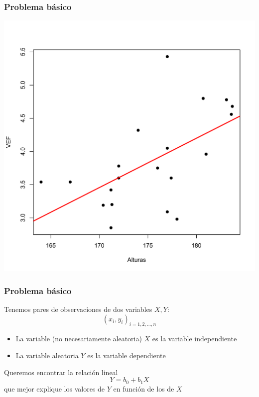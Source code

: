 \documentclass[12pt,t]{beamer}
\renewcommand{\emph}[1]{{\color{red}#1}}
\theoremstyle{plain}
\theoremstyle{definition}
\begin{document}
\begin{frame}
\frametitle{Problema básico}
\vspace*{-1cm}

\begin{center}
\includegraphics[width=0.8\linewidth]{plotVEF2.pdf}
\end{center}
\end{frame}




\begin{frame}
\frametitle{Problema básico}

Tenemos pares de observaciones de dos variables $X,Y$:
$$
(x_i,y_i)_{i=1,2,\ldots,n}
$$

\begin{itemize}
\item La variable (no necesariamente aleatoria) $X$ es la variable  \emph{independiente}

\item La variable aleatoria $Y$ es la variable \emph{dependiente}
\end{itemize}
\medskip

Queremos encontrar la \emph{relación lineal}  
$$
Y=b_0+b_1X
$$
que mejor explique los valores de $Y$ en función de  los de $X$
\end{frame}
\end{document}
